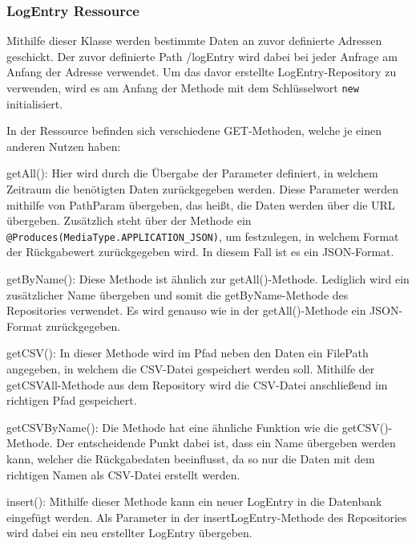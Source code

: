 \subsubsection{LogEntry Ressource}
Mithilfe dieser Klasse werden bestimmte Daten an zuvor definierte Adressen geschickt.
Der zuvor definierte Path \glq /logEntry\grq{} wird dabei bei jeder Anfrage am Anfang der Adresse verwendet.
Um das davor erstellte LogEntry-Repository zu verwenden, wird es am Anfang der Methode mit dem Schlüsselwort \texttt{new} initialisiert.


In der Ressource befinden sich verschiedene GET-Methoden, welche je einen anderen Nutzen haben:


\begin{compactitem}
\item getAll(): Hier wird durch die Übergabe der Parameter definiert, in welchem Zeitraum die benötigten Daten zurückgegeben werden. Diese Parameter werden mithilfe von PathParam übergeben, das heißt, die Daten werden über die URL übergeben. Zusätzlich steht über der Methode ein \texttt{@Produces(MediaType.APPLICATION\_JSON)}, um festzulegen, in welchem Format der Rückgabewert zurückgegeben wird. In diesem Fall ist es ein JSON-Format.
\item getByName(): Diese Methode ist ähnlich zur getAll()-Methode. Lediglich wird ein zusätzlicher Name übergeben und somit die getByName-Methode des Repositories verwendet. Es wird genauso wie in der getAll()-Methode ein JSON-Format zurückgegeben.
\item getCSV(): In dieser Methode wird im Pfad neben den Daten ein FilePath angegeben, in welchem die CSV-Datei gespeichert werden soll. Mithilfe der getCSVAll-Methode aus dem Repository wird die CSV-Datei anschließend im richtigen Pfad gespeichert.
\item getCSVByName(): Die Methode hat eine ähnliche Funktion wie die getCSV()-Methode. Der entscheidende Punkt dabei ist, dass ein Name übergeben werden kann, welcher die Rückgabedaten beeinflusst, da so nur die Daten mit dem richtigen Namen als CSV-Datei erstellt werden.
\item insert(): Mithilfe dieser Methode kann ein neuer LogEntry in die Datenbank eingefügt werden. Als Parameter in der insertLogEntry-Methode des Repositories wird dabei ein neu erstellter LogEntry übergeben.

\end{compactitem}

